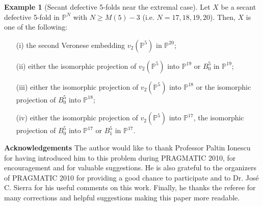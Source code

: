 \documentclass[11pt]{amsart}
\def\P{{\mathbb P}}
\theoremstyle{theorem} %
\theoremstyle{definition}
\newtheorem{Ex}[Thm]{Example}
\numberwithin{equation}{section}
\begin{document}
\begin{Ex}[Secant defective 5-folds near the extremal case]\label{new_defect}
Let $X$ be a secant defective 5-fold in $\P^N$ with $N\ge M(5) - 3$ (i.e. $N=17, 18, 19, 20$). Then, $X$ is one of the following:
\begin{itemize}
\item[(i)] the second Veronese embedding $v_2(\P^5)$ in $\P^{20}$;
\item[(ii)] either the isomorphic projection of $v_2(\P^5)$ into $\P^{19}$ or $B^5_0$ in $\P^{19}$;
\item[(iii)] either the isomorphic projection of $v_2(\P^5)$ into $\P^{18}$ or the isomorphic projection of $B^5_0$ into $\P^{18}$;
\item[(iv)] either the isomorphic projection of $v_2(\P^5)$ into $\P^{17}$, the isomorphic projection of $B^5_0$ into $\P^{17}$ or $B^5_1$ in $\P^{17}$.
\end{itemize}

\end{Ex}

{\bf Acknowledgements}  The author would like to thank Professor Paltin Ionescu for having introduced him to this problem during PRAGMATIC 2010, for encouragement and for valuable suggestions. He is also grateful to the organizers of PRAGMATIC 2010 for providing a good chance to participate and to Dr. Jos\'e C. Sierra for his useful comments on this work. Finally, he thanks the referee for many corrections and helpful suggestions making this paper more readable.
\end{document}
